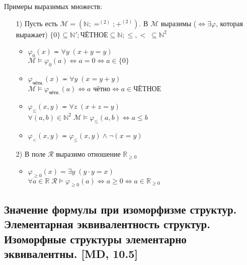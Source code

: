 \documentclass[a4paper, fleqn]{article}
\begin{document}
    Примеры выразимых множеств: \\
    \begin{enumerate}
        \item[1)] Пусть есть $\mathcal{M} = (\mathbb{N}; =^{(2)}; +^{(2)})$. В $\mathcal{M}$ выразимы ($\Leftrightarrow \exists \varphi$, которая выражает) $\{0\} \subseteq \mathbb{N}'; \text{ЧЁТНОЕ} \subseteq \mathbb{N}; \leq, < \; \subseteq \mathbb{N}^2$ \\
        \begin{itemize}
            \item $\varphi_0(x) \eqcirc \forall y \; (x + y = y)$ \\
            $\mathcal{M} \vDash \varphi_0(a) \Leftrightarrow a = 0 \Leftrightarrow a \in \{0\}$ \\
            \item $\varphi_{\text{чётн.}}(x) \eqcirc \forall y \; (x = y + y)$ \\
            $\mathcal{M} \vDash \varphi_{\text{чётн.}}(a) \Leftrightarrow a\text{ чётно} \Leftrightarrow a \in \text{ЧЁТНОЕ}$ \\
            \item $\varphi_{\leq}(x, y) \eqcirc \forall z \; (x + z = y)$ \\
            $\forall (a, b) \in \mathbb{N}^2 \; \mathcal{M} \vDash \varphi_{\leq}(a, b) \Leftrightarrow a \leq b$ \\
            \item $\varphi_{<}(x, y) \eqcirc \varphi_{\leq}(x, y) \wedge \neg (x = y)$
        \end{itemize}
        \item[2)] В поле $\mathcal{R}$ выразимо отношение $\mathbb{R}_{\geq 0}$ \\
        \begin{itemize}
            \item $\varphi_{\geq 0}(x) = \exists y \; (y \cdot y = x)$ \\
            $\forall a \in \mathbb{R} \; \mathcal{R} \vDash \varphi_{\geq 0}(a) \Leftrightarrow a \geq 0 \Leftrightarrow a \in \mathbb{R}_{\geq 0}$
        \end{itemize}
    \end{enumerate}
    \subsection{Значение формулы при изоморфизме структур. Элементарная эквивалентность структур. Изоморфные структуры элементарно эквивалентны. [MD, 10.5]}
 
\end{document}
